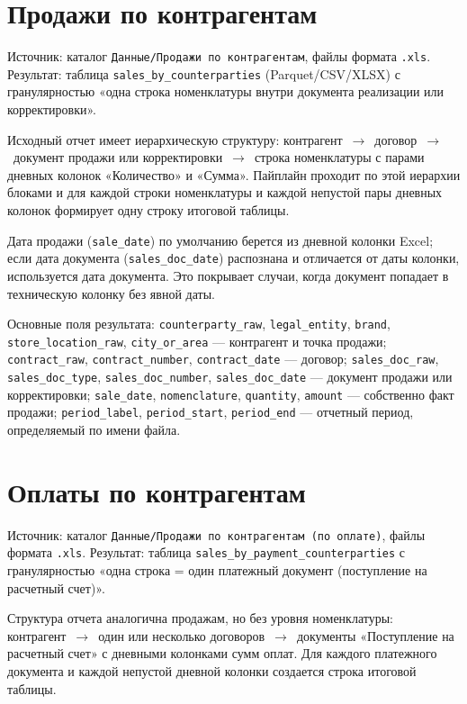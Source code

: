 \section{Продажи по контрагентам}

Источник: каталог \texttt{Данные/Продажи по контрагентам}, файлы формата \texttt{.xls}. Результат: таблица \texttt{sales\_by\_counterparties} (Parquet/CSV/XLSX) с гранулярностью «одна строка номенклатуры внутри документа реализации или корректировки».

Исходный отчет имеет иерархическую структуру: контрагент~$\rightarrow$~договор~$\rightarrow$~документ продажи или корректировки~$\rightarrow$~строка номенклатуры с парами дневных колонок «Количество» и «Сумма». Пайплайн проходит по этой иерархии блоками и для каждой строки номенклатуры и каждой непустой пары дневных колонок формирует одну строку итоговой таблицы.

Дата продажи (\texttt{sale\_date}) по умолчанию берется из дневной колонки Excel; если дата документа (\texttt{sales\_doc\_date}) распознана и отличается от даты колонки, используется дата документа. Это покрывает случаи, когда документ попадает в техническую колонку без явной даты.

Основные поля результата: \texttt{counterparty\_raw}, \texttt{legal\_entity}, \texttt{brand}, \texttt{store\_location\_raw}, \texttt{city\_or\_area} — контрагент и точка продажи; \texttt{contract\_raw}, \texttt{contract\_number}, \texttt{contract\_date} — договор; \texttt{sales\_doc\_raw}, \texttt{sales\_doc\_type}, \texttt{sales\_doc\_number}, \texttt{sales\_doc\_date} — документ продажи или корректировки; \texttt{sale\_date}, \texttt{nomenclature}, \texttt{quantity}, \texttt{amount} — собственно факт продажи; \texttt{period\_label}, \texttt{period\_start}, \texttt{period\_end} — отчетный период, определяемый по имени файла.

\section{Оплаты по контрагентам}

Источник: каталог \texttt{Данные/Продажи по контрагентам (по оплате)}, файлы формата \texttt{.xls}. Результат: таблица \texttt{sales\_by\_payment\_counterparties} с гранулярностью «одна строка = один платежный документ (поступление на расчетный счет)».

Структура отчета аналогична продажам, но без уровня номенклатуры: контрагент~$\rightarrow$~один или несколько договоров~$\rightarrow$~документы «Поступление на расчетный счет» с дневными колонками сумм оплат. Для каждого платежного документа и каждой непустой дневной колонки создается строка итоговой таблицы.

